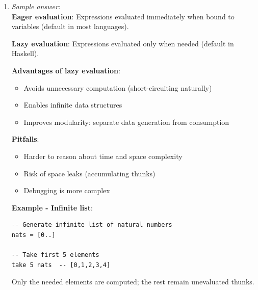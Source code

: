 \documentclass[11pt]{article}
\begin{document}
\begin{enumerate}[label=\textbf{\arabic*.}]
  \textbf{Examples}:
  \begin{itemize}
    \item \textbf{map}: Applies a function to each element: \texttt{map(f, [1,2,3]) $\to$ [f(1),f(2),f(3)]}. 
    Reuses iteration logic for any transformation
    \item \textbf{filter}: Selects elements matching a predicate: \texttt{filter(isEven, [1,2,3,4]) $\to$ [2,4]}. 
    Reuses selection logic
    \item \textbf{reduce (fold)}: Combines elements using a binary operation: 
    \texttt{reduce(+, [1,2,3]) $\to$ 6}. Generalizes aggregation
  \end{itemize}

  These higher-order functions eliminate explicit loops and promote composition.

  \item \emph{Sample answer:}\\
  \textbf{Eager evaluation}: Expressions evaluated immediately when bound to variables (default in most languages).

  \textbf{Lazy evaluation}: Expressions evaluated only when needed (default in Haskell).

  \textbf{Advantages of lazy evaluation}:
  \begin{itemize}
    \item Avoids unnecessary computation (short-circuiting naturally)
    \item Enables infinite data structures
    \item Improves modularity: separate data generation from consumption
  \end{itemize}

  \textbf{Pitfalls}:
  \begin{itemize}
    \item Harder to reason about time and space complexity
    \item Risk of space leaks (accumulating thunks)
    \item Debugging is more complex
  \end{itemize}

  \textbf{Example - Infinite list}:
\begin{verbatim}
-- Generate infinite list of natural numbers
nats = [0..]

-- Take first 5 elements
take 5 nats  -- [0,1,2,3,4]
\end{verbatim}
  Only the needed elements are computed; the rest remain unevaluated thunks.


\end{enumerate}
\end{document}
